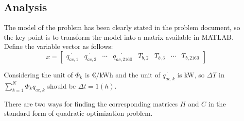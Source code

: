 \documentclass[titlepage,a4paper]{article}
\begin{document}
\fi

    \setlength{\parindent}{0pt}
    \setlength{\parskip}{0.5em} 

    \subsection{Analysis}

    The model of the problem has been clearly stated in the problem document, so the key point is to transform the model into a matrix available in MATLAB. Define the variable vector as follows:
    $$
    x=
    \begin{bmatrix}
        \dot{q_{ac,1}} & \dot{q_{ac,2}} & \cdots &\dot{q_{ac,2160}} &T_{b,2} & T_{b,3} & \cdots & T_{b,2160}
    \end{bmatrix} 
    $$

    Considering the unit of $\Phi_k$ is \euro/kWh and the unit of $\dot{q_{ac,k}}$ is kW, so $\Delta T$ in $\sum_{k=1}^N \Phi_k \dot{q_{ac,k}}$ should be $\Delta t = 1 (h)$.

    There are two ways for finding the corresponding matrices $H$ and $C$ in the standard form of quadratic optimization problem.
\end{document}
